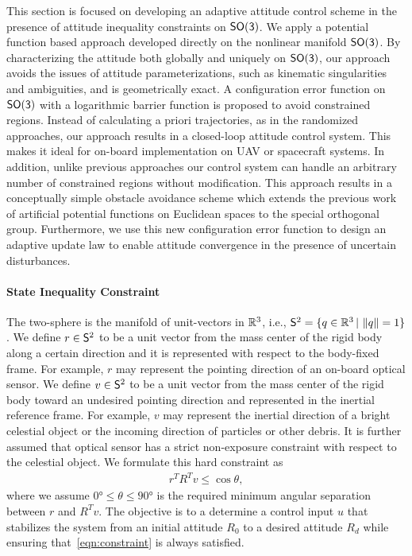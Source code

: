 This section is focused on developing an adaptive attitude control scheme in the presence of attitude inequality constraints on \(\mathsf{SO(3)}\).
We apply a potential function based approach developed directly on the nonlinear manifold \(\mathsf{SO(3)}\). 
By characterizing the attitude both globally and uniquely on \(\mathsf{SO(3)}\), our approach avoids the issues of attitude parameterizations, such as kinematic singularities and ambiguities, and is geometrically exact. 
A configuration error function on \(\mathsf{SO(3)}\) with a logarithmic barrier function is proposed to avoid constrained regions. 
Instead of calculating a priori trajectories, as in the randomized approaches, our approach results in a closed-loop attitude control system. 
This makes it ideal for on-board implementation on UAV or spacecraft systems. 
In addition, unlike previous approaches our control system can handle an arbitrary number of constrained regions without modification.
This approach results in a conceptually simple obstacle avoidance scheme which extends the previous work of artificial potential functions on Euclidean spaces to the special orthogonal group.
Furthermore, we use this new configuration error function to design an adaptive update law to enable attitude convergence in the presence of uncertain disturbances. 

\paragraph{State Inequality Constraint}\label{sec:state_inequality_constraint}
The two-sphere is the manifold of unit-vectors in \( \mathbb{R}^3 \), i.e., \( \mathsf{S}^2 = \{ q \in \mathbb{R}^3 \,  \vert \, \left\| q \right\| = 1 \}\).
We define \( r \in \mathsf{S}^2 \) to be a unit vector from the mass center of the rigid body along a certain direction and it is represented with respect to the body-fixed frame.
For example, \( r \) may represent the pointing direction of an on-board optical sensor.
We define \( v \in \mathsf{S}^2 \) to be a unit vector from the mass center of the rigid body toward an undesired pointing direction and represented in the inertial reference frame.
For example, \( v \) may represent the inertial direction of a bright celestial object or the incoming direction of particles or other debris.
It is further assumed that optical sensor has a strict non-exposure constraint with respect to the celestial object.
We formulate this hard constraint as
\begin{align}
	r^T R^T v \leq \cos \theta , \label{eqn:constraint}
\end{align}
where we assume \( \ang{0} \leq \theta \leq \ang{90}  \) is the required minimum angular separation between \( r \) and \( R^T v \). 
The objective is to a determine a control input \( u \) that stabilizes the system from an initial attitude \( R_0 \) to a desired attitude \( R_d \) while ensuring that~\cref{eqn:constraint} is always satisfied.

